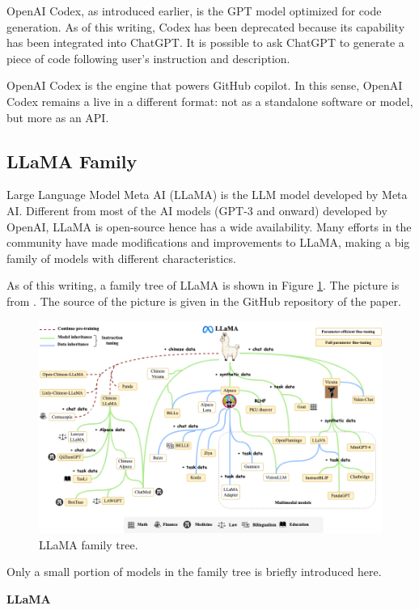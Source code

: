 OpenAI Codex, as introduced earlier, is the GPT model optimized for code generation. As of this writing, Codex has been deprecated because its capability has been integrated into ChatGPT. It is possible to ask ChatGPT to generate a piece of code following user's instruction and description.

OpenAI Codex is the engine that powers GitHub copilot. In this sense, OpenAI Codex remains a live in a different format: not as a standalone software or model, but more as an API.

\subsection{LLaMA Family}

Large Language Model Meta AI (LLaMA) is the LLM model developed by Meta AI. Different from most of the AI models (GPT-3 and onward) developed by OpenAI, LLaMA is open-source hence has a wide availability. Many efforts in the community have made modifications and improvements to LLaMA, making a big family of models with different characteristics.

As of this writing, a family tree of LLaMA is shown in Figure \ref{fig:llama_family_tree}. The picture is from \cite{zhao2023survey}. The source of the picture is given in the GitHub repository of the paper.
\begin{figure}[!htb]
	\centering
	\includegraphics[width=\textwidth]{./chapters/part-7/figures/lamma_family_tree.png}
	\caption{LLaMA family tree.}
	\label{fig:llama_family_tree}
\end{figure}
Only a small portion of models in the family tree is briefly introduced here.

\vspace{0.1in}
\noindent \textbf{LLaMA}
\vspace{0.1in}

